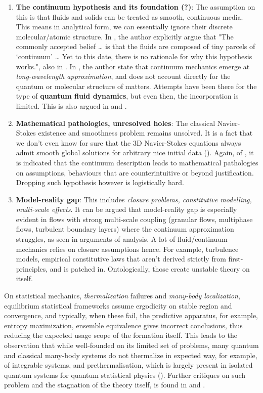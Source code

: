 \begin{enumerate}[leftmargin=0.5cm,topsep=1pt,itemsep=1pt]
	\item \textbf{The continuum hypothesis and its foundation (?)}: The assumption on this is that fluids and solids can be treated as smooth, continuous media. This means in analytical form, we can essentially ignore their discrete molecular/atomic structure. In \cite{Sharma2022RevisitingFluidMechanics}, the author explicitly argue that "The commonly accepted belief … is that the fluids are composed of tiny parcels of `continuum' … Yet to this date, there is no rationale for why this hypothesis works.", also in \cite{Fefferman2006}. In \cite{Mariano2023FoundationalContinuum}, the author state that continuum mechanics emerge at \textit{long-wavelength approximation}, and does not account directly for the quantum or molecular structure of matters. Attempts have been there for the type of \textbf{quantum fluid dynamics}, but even then, the incorporation is limited. This is also argued in \cite{Kolmogorov1941} and \cite{Frisch1995}. 
	\item \textbf{Mathematical pathologies, unresolved holes}: The classical Navier-Stokes existence and smoothness problem remains unsolved. It is a fact that we don't even know for sure that the 3D Navier-Stokes equations always admit smooth global solutions for arbitrary nice initial data (\cite{Dou2022NoExistenceNavierStokes,NSMillenniumProblemWikipedia}). Again, of \cite{Sharma2022RevisitingFluidMechanics}, it is indicated that the continuum description leads to mathematical pathologies on assumptions, behaviours that are counterintuitive or beyond justification. Dropping such hypothesis however is logistically hard. 
	\item \textbf{Model-reality gap}: This includes \textit{closure problems, constitutive modelling, multi-scale effects}. It can be argued that model-reality gap is especially evident in flows with strong multi-scale coupling (granular flows, multiphase flows, turbulent boundary layers) where the continuum approximation struggles, as seen in arguments of \cite{en16010065} analysis. A lot of fluid/continuum mechanics relies on closure assumptions hence. For example, turbulence models, empirical constitutive laws that aren't derived strictly from first-principles, and is patched in. Ontologically, those create unstable theory on itself. 
\end{enumerate}
On statistical mechanics, \textit{thermalization} failures and \textit{many-body localization}, equilibrium statistical frameworks assume ergodicity on stable region and convergence, and typically, when these fail, the predictive apparatus, for example, entropy maximization, ensemble equivalence gives incorrect conclusions, thus reducing the expected usage scope of the formation itself. This leads to the observation that while well-founded on its limited set of problems, many quantum and classical many-body systems do not thermalize in expected way, for example, of integrable systems, and prethermalisation, which is largely present in isolated quantum systems for quantum statistical physics (\cite{Mori_2018}). Further critiques on such problem and the stagnation of the theory itself, is found in \cite{Rigol2007,Basko2006,Polkovnikov2011} and \cite{Gogolin2016}.
